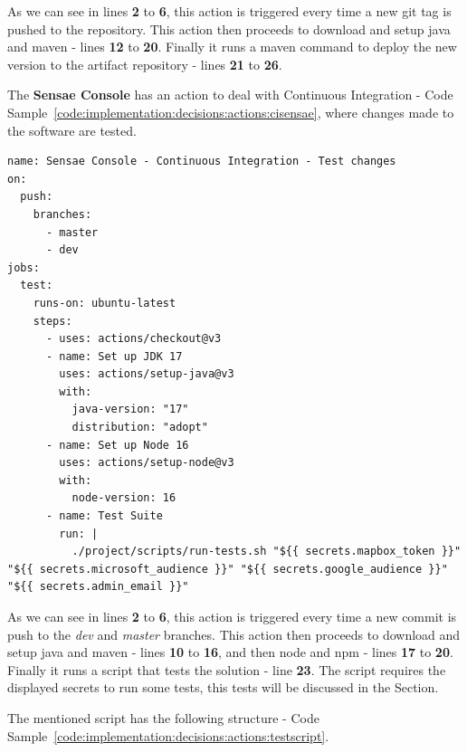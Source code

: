 As we can see in lines \textbf{2} to \textbf{6}, this action is triggered every time a new git tag is pushed to the repository.
This action then proceeds to download and setup java and maven - lines \textbf{12} to \textbf{20}. Finally it runs a maven command to deploy the new version to the artifact repository - lines \textbf{21} to \textbf{26}. 

The \textbf{Sensae Console} has an action to deal with Continuous Integration - Code Sample~\ref{code:implementation:decisions:actions:cisensae}, where changes made to the software are tested.

\begin{lstlisting}[style=yaml, caption=Configuration File for \textbf{Sensae Console} Continuous Integration, label={code:implementation:decisions:actions:cisensae}]
name: Sensae Console - Continuous Integration - Test changes
on:
  push:
    branches:
      - master
      - dev
jobs:
  test:
    runs-on: ubuntu-latest
    steps:
      - uses: actions/checkout@v3
      - name: Set up JDK 17
        uses: actions/setup-java@v3
        with:
          java-version: "17"
          distribution: "adopt"
      - name: Set up Node 16
        uses: actions/setup-node@v3
        with:
          node-version: 16
      - name: Test Suite
        run: |
          ./project/scripts/run-tests.sh "${{ secrets.mapbox_token }}" "${{ secrets.microsoft_audience }}" "${{ secrets.google_audience }}" "${{ secrets.admin_email }}"

\end{lstlisting}

As we can see in lines \textbf{2} to \textbf{6}, this action is triggered every time a new commit is push to the \textit{dev} and \textit{master} branches.
This action then proceeds to download and setup java and maven - lines \textbf{10} to \textbf{16}, and then node and npm - lines \textbf{17} to \textbf{20}. Finally it runs a script that tests the solution - line \textbf{23}. The script requires the displayed secrets to run some tests, this tests will be discussed in the  Section.

The mentioned script has the following structure - Code Sample~\ref{code:implementation:decisions:actions:testscript}.

